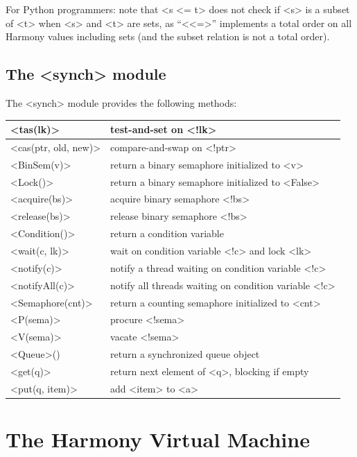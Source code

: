 \documentclass{report}
\begin{document}
\vspace{1em}
For Python programmers: note that <{s <= t}> does not check if <{s}> is a subset of
<{t}> when <{s}> and <{t}> are sets, as ``<{<=}>'' implements a total order on all Harmony values including sets (and the subset relation is not a total order).

\section{The <{synch}> module}

%
The <{synch}> module provides the following methods:

\vspace{1em}
\begin{tabular}{|l|l|}
\hline
<{tas(lk)}> & test-and-set on <{!lk}> \\
\hline
<{cas(ptr, old, new)}> & compare-and-swap on <{!ptr}> \\
\hline
<{BinSem(v)}> & return a binary semaphore initialized to <{v}> \\
\hline
<{Lock()}> & return a binary semaphore initialized to <{False}> \\
\hline
<{acquire(bs)}> & acquire binary semaphore <{!bs}> \\
\hline
<{release(bs)}> & release binary semaphore <{!bs}> \\
\hline
<{Condition()}> & return a condition variable \\
\hline
<{wait(c, lk)}> & wait on condition variable <{!c}>
and lock <{lk}> \\ \hline
<{notify(c)}> & notify a thread waiting on condition variable <{!c}> \\
\hline
<{notifyAll(c)}> & notify all threads waiting on condition variable <{!c}> \\
\hline
<{Semaphore(cnt)}> & return a counting semaphore initialized to <{cnt}> \\
\hline
<{P(sema)}> & procure <{!sema}>  \\
\hline
<{V(sema)}> & vacate <{!sema}>  \\
\hline
<{Queue}>() & return a synchronized queue object \\
\hline
<{get(q)}> & return next element of <{q}>, blocking if empty \\
\hline
<{put(q, item)}> & add <{item}> to <{a}> \\
\hline
\end{tabular}


\chapter{The Harmony Virtual Machine}\label{ap:hvm}
\end{document}
